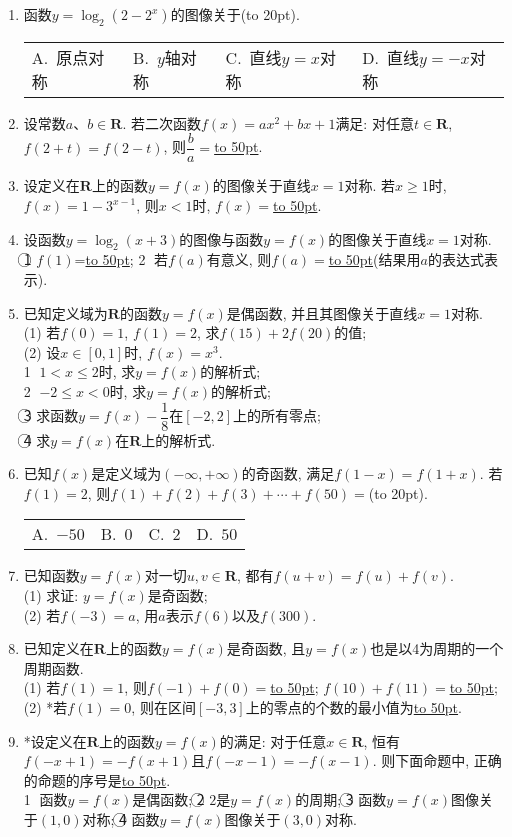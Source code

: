 \documentclass[10pt,a4paper]{article}
\newcommand{\blank}[1]{\underline{\hbox to #1pt{}}}
\newcommand{\bracket}[1]{(\hbox to #1pt{})}
\newcommand{\fourch}[4]{\par\begin{tabular}{p{.23\textwidth}p{.23\textwidth}p{.23\textwidth}p{.23\textwidth}}
A.~#1 &B.~#2& C.~#3& D.~#4
\end{tabular}}
\begin{document}
\begin{enumerate}[1.]
\fourch{原点对称}{$y$轴对称}{直线$y=x$对称}{直线$y=-x$对称}
\item 函数$y=\log_2(2-2^x)$的图像关于\bracket{20}.
\fourch{原点对称}{$y$轴对称}{直线$y=x$对称}{直线$y=-x$对称}
\item 设常数$a$、$b\in \mathbf{R}$. 若二次函数$f(x)=ax^2+bx+1$满足: 对任意$t\in \mathbf{R}$, $f(2+t)=f(2-t)$, 则$\dfrac ba=$\blank{50}.
\item 设定义在$\mathbf{R}$上的函数$y=f(x)$的图像关于直线$x=1$对称. 若$x\ge 1$时, $f(x)=1-3^{x-1}$, 则$x<1$时, $f(x)=$\blank{50}.
\item 设函数$y=\log_2(x+3)$的图像与函数$y=f(x)$的图像关于直线$x=1$对称. \textcircled{1} $f(1)$=\blank{50}; \textcircled{2} 若$f(a)$有意义, 则$f(a)=$\blank{50}(结果用$a$的表达式表示).
\item 已知定义域为$\mathbf{R}$的函数$y=f(x)$是偶函数, 并且其图像关于直线$x=1$对称.\\
(1) 若$f(0)=1$, $f(1)=2$, 求$f(15)+2f(20)$的值;\\
(2) 设$x\in [0,1]$时, $f(x)=x^3$.\\
\textcircled{1} $1<x\le 2$时, 求$y=f(x)$的解析式;\\
\textcircled{2} $-2\le x<0$时, 求$y=f(x)$的解析式;\\
\textcircled{3} 求函数$y=f(x)-\dfrac 18$在$[-2,2]$上的所有零点;\\
\textcircled{4} 求$y=f(x)$在$\mathbf{R}$上的解析式.
\item 已知$f(x)$是定义域为$(-\infty,+\infty)$的奇函数, 满足$f(1-x)=f(1+x)$. 若$f(1)=2$, 则$f(1)+f(2)+f(3)+\cdots +f(50)=$\bracket{20}.
\fourch{$-50$}{$0$}{$2$}{$50$}
\item 已知函数$y=f(x)$对一切$u,v\in \mathbf{R}$, 都有$f(u+v)=f(u)+f(v)$.\\
(1)	求证: $y=f(x)$是奇函数;\\ 
(2) 若$f(-3)=a$, 用$a$表示$f(6)$以及$f(300)$.
\item 已知定义在$\mathbf{R}$上的函数$y=f(x)$是奇函数, 且$y=f(x)$也是以4为周期的一个周期函数.\\
(1) 若$f(1)=1$, 则$f(-1)+f(0)=$\blank{50}; $f(10)+f(11)=$\blank{50};\\
(2) *若$f(1)=0$, 则在区间$[-3,3]$上的零点的个数的最小值为\blank{50}.
\item *设定义在$\mathbf{R}$上的函数$y=f(x)$的满足: 对于任意$x\in \mathbf{R}$, 恒有$f(-x+1)=-f(x+1)$且$f(-x-1)=-f(x-1)$. 则下面命题中, 正确的命题的序号是\blank{50}.\\
\textcircled{1} 函数$y=f(x)$是偶函数; \textcircled{2} $2$是$y=f(x)$的周期; \textcircled{3} 函数$y=f(x)$图像关于$(1,0)$对称; \textcircled{4} 函数$y=f(x)$图像关于$(3,0)$对称.



\end{enumerate}
\end{document}
